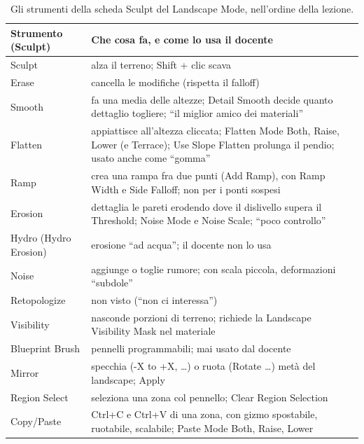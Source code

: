 \begin{table}[htbp]
\centering
\small
\begin{tabular}{@{}p{3.0cm}p{11.0cm}@{}}
\toprule
\textbf{Strumento (Sculpt)} & \textbf{Che cosa fa, e come lo usa il docente} \\
\midrule
Sculpt & alza il terreno; Shift + clic scava \\
Erase & cancella le modifiche (rispetta il falloff) \\
Smooth & fa una media delle altezze; Detail Smooth decide quanto dettaglio togliere; ``il
miglior amico dei materiali'' \\
Flatten & appiattisce all'altezza cliccata; Flatten Mode Both, Raise, Lower (e Terrace);
Use Slope Flatten prolunga il pendio; usato anche come ``gomma'' \\
Ramp & crea una rampa fra due punti (Add Ramp), con Ramp Width e Side Falloff; non per i
ponti sospesi \\
Erosion & dettaglia le pareti erodendo dove il dislivello supera il Threshold; Noise Mode e
Noise Scale; ``poco controllo'' \\
Hydro (Hydro Erosion) & erosione ``ad acqua''; il docente non lo usa \\
Noise & aggiunge o toglie rumore; con scala piccola, deformazioni ``subdole'' \\
Retopologize & non visto (``non ci interessa'') \\
Visibility & nasconde porzioni di terreno; richiede la Landscape Visibility Mask nel
materiale \\
Blueprint Brush & pennelli programmabili; mai usato dal docente \\
Mirror & specchia (-X to +X, \dots) o ruota (Rotate \dots) metà del landscape; Apply \\
Region Select & seleziona una zona col pennello; Clear Region Selection \\
Copy/Paste & Ctrl+C e Ctrl+V di una zona, con gizmo spostabile, ruotabile, scalabile;
Paste Mode Both, Raise, Lower \\
\bottomrule
\end{tabular}
\caption{Gli strumenti della scheda Sculpt del Landscape Mode, nell'ordine della lezione.}
\label{ue14:tab:sculpt}
\end{table}

